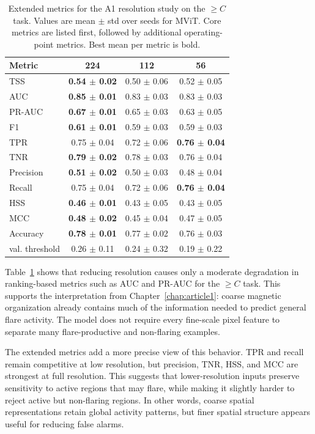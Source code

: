 \begin{table}[!htbp]
\centering
\footnotesize
\setlength{\tabcolsep}{4pt}
\caption{Extended metrics for the A1 resolution study on the $\geq C$ task. Values are mean $\pm$ std over seeds for MViT. Core metrics are listed first, followed by additional operating-point metrics. Best mean per metric is bold.}
\label{tab:appendix_res_c}
\begin{tabular}{lccc}
\toprule
Metric & 224 & 112 & 56 \\
\midrule
TSS & \textbf{0.54 $\pm$ 0.02} & 0.50 $\pm$ 0.06 & 0.52 $\pm$ 0.05 \\
AUC & \textbf{0.85 $\pm$ 0.01} & 0.83 $\pm$ 0.03 & 0.83 $\pm$ 0.03 \\
PR-AUC & \textbf{0.67 $\pm$ 0.01} & 0.65 $\pm$ 0.03 & 0.63 $\pm$ 0.05 \\
F1 & \textbf{0.61 $\pm$ 0.01} & 0.59 $\pm$ 0.03 & 0.59 $\pm$ 0.03 \\
TPR & 0.75 $\pm$ 0.04 & 0.72 $\pm$ 0.06 & \textbf{0.76 $\pm$ 0.04} \\
TNR & \textbf{0.79 $\pm$ 0.02} & 0.78 $\pm$ 0.03 & 0.76 $\pm$ 0.04 \\
Precision & \textbf{0.51 $\pm$ 0.02} & 0.50 $\pm$ 0.03 & 0.48 $\pm$ 0.04 \\
Recall & 0.75 $\pm$ 0.04 & 0.72 $\pm$ 0.06 & \textbf{0.76 $\pm$ 0.04} \\
HSS & \textbf{0.46 $\pm$ 0.01} & 0.43 $\pm$ 0.05 & 0.43 $\pm$ 0.05 \\
MCC & \textbf{0.48 $\pm$ 0.02} & 0.45 $\pm$ 0.04 & 0.47 $\pm$ 0.05 \\
Accuracy & \textbf{0.78 $\pm$ 0.01} & 0.77 $\pm$ 0.02 & 0.76 $\pm$ 0.03 \\
val. threshold & 0.26 $\pm$ 0.11 & 0.24 $\pm$ 0.32 & 0.19 $\pm$ 0.22 \\
\bottomrule
\end{tabular}
\end{table}

\FloatBarrier

Table~\ref{tab:appendix_res_c} shows that reducing resolution causes only a moderate degradation in ranking-based metrics such as AUC and PR-AUC for the $\geq C$ task. This supports the interpretation from Chapter~\ref{chap:article1}: coarse magnetic organization already contains much of the information needed to predict general flare activity. The model does not require every fine-scale pixel feature to separate many flare-productive and non-flaring examples.

The extended metrics add a more precise view of this behavior. TPR and recall remain competitive at low resolution, but precision, TNR, HSS, and MCC are strongest at full resolution. This suggests that lower-resolution inputs preserve sensitivity to active regions that may flare, while making it slightly harder to reject active but non-flaring regions. In other words, coarse spatial representations retain global activity patterns, but finer spatial structure appears useful for reducing false alarms.

